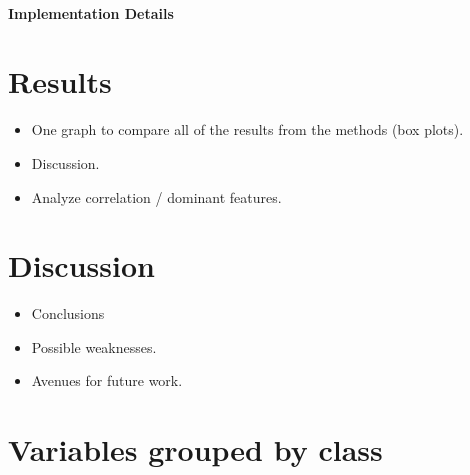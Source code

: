 \documentclass[11pt]{article}
\newcommand{\todo}[1]{{\color{orange}{TODO: #1}}}
\begin{document}
\paragraph{Implementation Details} \todo{Details about the implementation of the Doubly Robust Estimator.}







\section{Results}

\begin{itemize}
    \item One graph to compare all of the results from the methods (box plots).
    \item Discussion.
    \item Analyze correlation / dominant features.
\end{itemize}

\section{Discussion}

\begin{itemize}
    \item Conclusions
    \item Possible weaknesses.
    \item Avenues for future work.
\end{itemize}



\appendix

\newpage
\section{Variables grouped by class}
\end{document}
